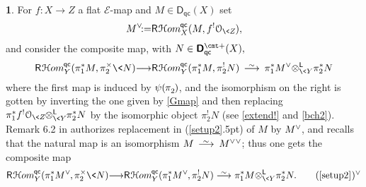 \documentclass{compositio}
\theoremstyle{plain}
\theoremstyle{definition}
\newtheorem{cosa}[thm]{}
\theoremstyle{remark}
\numberwithin{equation}{thm}
\begin{document}
\begin{cosa}
For $f\colon X\to Z$ a flat ${\mathscr{E}}$-map and $M\in{{\boldsymbol{\mathsf{D}}}_{\mathsf{qc}}}(X)$  set {}
\[
M^\vee{\!:=}{{\mathsf R}{\mkern1mu}{{\mathcal H} om}_{{X}}^{{\mkern-1mu}{\mathsf{qc}}}}(M, f^!{\mathcal O_{\<Z}}{\mkern-1mu}),
\]
and consider the composite map, with $N\in{{\boldsymbol{\mathsf{D}}}_{\mathsf{qc}}^{{\vbox to 0pt{\vskip-.95 ex\hbox{$\scriptstyle \text{\cmt\char'053}$}\vss}}}}(X),$
\begin{equation}
\label{setup2}
{{\mathsf R}{\mkern1mu}{{\mathcal H} om}_{{Y}}^{{\mkern-1mu}{\mathsf{qc}}}}(\pi_1^*M,\pi_2^{\times}\<N) 
{\longrightarrow}  {{\mathsf R}{\mkern1mu}{{\mathcal H} om}_{{Y}}^{{\mkern-1mu}{\mathsf{qc}}}}(\pi_1^*M,\pi_2^!N) {{\mkern8mu\longrightarrow \mkern-25.5mu{}^\sim\mkern17mu}} \pi_1^*M^{\vee} {\otimes^{\mathsf L}_{{\<Y}}}\pi_2^*N
\end{equation}
where the first map is induced by $\psi({\mkern-1mu}\pi^{}_2{\mkern-1mu})$, and the isomorphism on the right is gotten by inverting the one given by \ref{Gmap} and then replacing 
\mbox{$\pi_1^*f^!{\mathcal O_{\<Z}}{\mkern-1mu}{\otimes^{\mathsf L}_{{\<Y}}}{\mkern-1mu}\pi_2^*N$} by the isomorphic object $\pi_2^!N$ (see \eqref{extend!} and \eqref{bch2}).
Remark 6.2 in \cite{AILN} authorizes replacement in (\ref{setup2}{\kern.5pt}) of $M$ by $M^\vee{\mkern-1mu}$, and recalls that the natural map is an isomorphism $M{{\mkern8mu\longrightarrow \mkern-25.5mu{}^\sim\mkern17mu}} \smash{{M^\vee}}^\vee$; thus one gets the composite map{}
\begin{equation*}
\label{setup2v}
{{\mathsf R}{\mkern1mu}{{\mathcal H} om}_{{Y}}^{{\mkern-1mu}{\mathsf{qc}}}}(\pi_1^*M^\vee{\mkern-1mu},\pi_2^{\times}\<N) 
{\longrightarrow}  {{\mathsf R}{\mkern1mu}{{\mathcal H} om}_{{Y}}^{{\mkern-1mu}{\mathsf{qc}}}}(\pi_1^*M^\vee{\mkern-1mu},\pi_2^!N) \!{{\mkern8mu\longrightarrow \mkern-25.5mu{}^\sim\mkern17mu}}\! \pi_1^*M {\otimes^{\mathsf L}_{{\<Y}}}\pi_2^*N.
\tag*{(\ref{setup2}{\kern.5pt}){$^\vee$}}
\end{equation*}

\pagebreak


\end{cosa}
\end{document}
